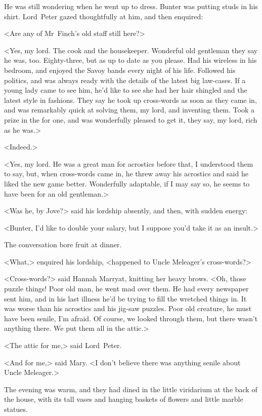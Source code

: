 He was still wondering when he went up to dress. Bunter was putting studs in his shirt. Lord~Peter gazed thoughtfully at him, and then enquired:

<Are any of Mr~Finch's old staff still here?>

<Yes, my lord. The cook and the housekeeper. Wonderful old gentleman they say he was, too. Eighty-three, but as up to date as you please. Had his wireless in his bedroom, and enjoyed the Savoy bands every night of his life. Followed his politics, and was always ready with the details of the latest big law-cases. If a young lady came to see him, he'd like to see she had her hair shingled and the latest style in fashions. They say he took up cross-words as soon as they came in, and was remarkably quick at solving them, my lord, and inventing them. Took a  prize in the  for one, and was wonderfully pleased to get it, they say, my lord, rich as he was.>

<Indeed.>

<Yes, my lord. He was a great man for acrostics before that, I understood them to say, but, when cross-words came in, he threw away his acrostics and said he liked the new game better. Wonderfully adaptable, if I may say so, he seems to have been for an old gentleman.>

<Was he, by Jove?> said his lordship absently, and then, with sudden energy:

<Bunter, I'd like to double your salary, but I suppose you'd take it as an insult.>

The conversation bore fruit at dinner.

<What,> enquired his lordship, <happened to Uncle Meleager's cross-words?>

<Cross-words?> said Hannah Marryat, knitting her heavy brows. <Oh, those puzzle things! Poor old man, he went mad over them. He had every newspaper sent him, and in his last illness he'd be trying to fill the wretched things in. It was worse than his acrostics and his jig-saw puzzles. Poor old creature, he must have been senile, I'm afraid. Of course, we looked through them, but there wasn't anything there. We put them all in the attic.>

<The attic for me,> said Lord~Peter.

<And for me,> said Mary. <I don't believe there was anything senile about Uncle Meleager.>

The evening was warm, and they had dined in the little viridarium at the back of the house, with its tall vases and hanging baskets of flowers and little marble statues.

